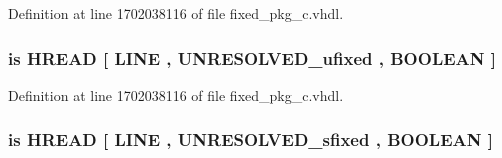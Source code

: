 Definition at line 1702038116 of file fixed\+\_\+pkg\+\_\+c.\+vhdl.

\hypertarget{classfixed__pkg_a912490cbabb862a76a9769b0a04e9b48}{}
\subsubsection[{H\+E\+X\+\_\+\+R\+E\+A\+D}]{ {\bfseries \textcolor{keywordflow}{is}\textcolor{vhdlchar}{ }\textcolor{vhdlchar}{H\+R\+E\+A\+D}\textcolor{vhdlchar}{ }\textcolor{vhdlchar}{\mbox{[}}\textcolor{vhdlchar}{ }\textcolor{vhdlchar}{L\+I\+N\+E}\textcolor{vhdlchar}{ }\textcolor{vhdlchar}{,}\textcolor{vhdlchar}{ }{\bfseries {\bf U\+N\+R\+E\+S\+O\+L\+V\+E\+D\+\_\+ufixed}} \textcolor{vhdlchar}{ }\textcolor{vhdlchar}{,}\textcolor{vhdlchar}{ }\textcolor{comment}{B\+O\+O\+L\+E\+A\+N}\textcolor{vhdlchar}{ }\textcolor{vhdlchar}{\mbox{]}}\textcolor{vhdlchar}{ }} \hspace{0.3cm}{\ttfamily [Alias]}}\label{classfixed__pkg_a912490cbabb862a76a9769b0a04e9b48}


Definition at line 1702038116 of file fixed\+\_\+pkg\+\_\+c.\+vhdl.

\hypertarget{classfixed__pkg_aedd687730eae80238d4fa21dc624bad2}{}
\subsubsection[{H\+E\+X\+\_\+\+R\+E\+A\+D}]{ {\bfseries \textcolor{keywordflow}{is}\textcolor{vhdlchar}{ }\textcolor{vhdlchar}{H\+R\+E\+A\+D}\textcolor{vhdlchar}{ }\textcolor{vhdlchar}{\mbox{[}}\textcolor{vhdlchar}{ }\textcolor{vhdlchar}{L\+I\+N\+E}\textcolor{vhdlchar}{ }\textcolor{vhdlchar}{,}\textcolor{vhdlchar}{ }{\bfseries {\bf U\+N\+R\+E\+S\+O\+L\+V\+E\+D\+\_\+sfixed}} \textcolor{vhdlchar}{ }\textcolor{vhdlchar}{,}\textcolor{vhdlchar}{ }\textcolor{comment}{B\+O\+O\+L\+E\+A\+N}\textcolor{vhdlchar}{ }\textcolor{vhdlchar}{\mbox{]}}\textcolor{vhdlchar}{ }} \hspace{0.3cm}{\ttfamily [Alias]}}\label{classfixed__pkg_aedd687730eae80238d4fa21dc624bad2}


